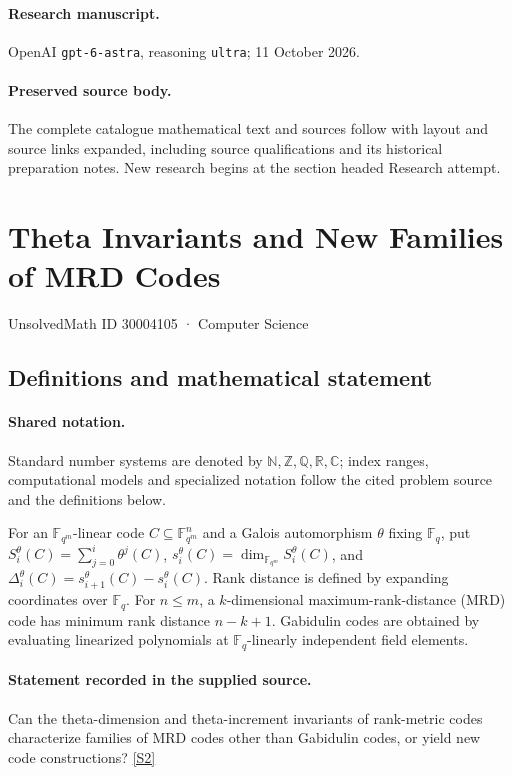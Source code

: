\documentclass[11pt]{article}
\begin{document}
\paragraph{Research manuscript.} OpenAI \texttt{gpt-6-astra}, reasoning \texttt{ultra}; 11 October 2026.
\paragraph{Preserved source body.} The complete catalogue mathematical text and sources follow with layout and source links expanded, including source qualifications and its historical preparation notes. New research begins at the section headed Research attempt.

\section{Theta Invariants and New Families of MRD Codes}\label{30004105}
{\small UnsolvedMath ID 30004105 · Computer Science}
\subsection{Definitions and mathematical statement}

\paragraph{Shared notation.}Standard number systems are denoted by $\mathbb N,\mathbb Z,\mathbb Q,\mathbb R,\mathbb C$; index ranges, computational models and specialized notation follow the cited problem source and the definitions below.


For an $\mathbb F_{q^m}$-linear code $C\subseteq\mathbb F_{q^m}^{n}$ and a Galois automorphism $\theta$ fixing $\mathbb F_q$, put $S_i^\theta(C)=\sum_{j=0}^{i}\theta^j(C)$, $s_i^\theta(C)=\dim_{\mathbb F_{q^m}}S_i^\theta(C)$, and $\Delta_i^\theta(C)=s_{i+1}^\theta(C)-s_i^\theta(C)$. Rank distance is defined by expanding coordinates over $\mathbb F_q$. For $n\leq m$, a $k$-dimensional maximum-rank-distance (MRD) code has minimum rank distance $n-k+1$. Gabidulin codes are obtained by evaluating linearized polynomials at $\mathbb F_q$-linearly independent field elements.
\paragraph{Statement recorded in the supplied source.}
Can the theta-dimension and theta-increment invariants of rank-metric codes characterize families of MRD codes other than Gabidulin codes, or yield new code constructions? \href{https://doi.org/10.4171/owr/2019/13}{[S2]}
\end{document}
